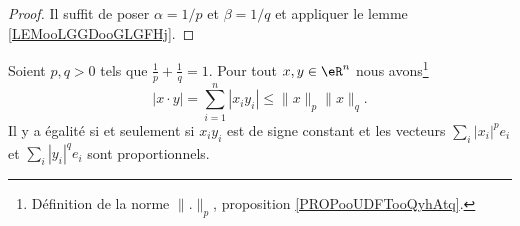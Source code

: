 \begin{proof}
	Il suffit de poser \( \alpha=1/p\) et \( \beta=1/q\) et appliquer le lemme \ref{LEMooLGGDooGLGFHj}.
\end{proof}

\begin{theorem}        \label{THOooYHMJooBlXfpl}
	Soient \( p,q>0\) tels que \( \frac{1}{ p }+\frac{1}{ q }=1\). Pour tout \( x,y\in \eR^n\) nous avons\footnote{Définition de la norme \( \| . \|_p\), proposition \ref{PROPooUDFTooQyhAtq}.}
	\begin{equation}
		| x\cdot y |=\sum_{i=1}^n| x_iy_i |\leq \| x \|_p\| x \|_q.
	\end{equation}
	Il y a égalité si et seulement si \( x_iy_i\) est de signe constant et les vecteurs \( \sum_i| x_i |^pe_i\) et \( \sum_i| y_i |^qe_i\) sont proportionnels.
\end{theorem}

